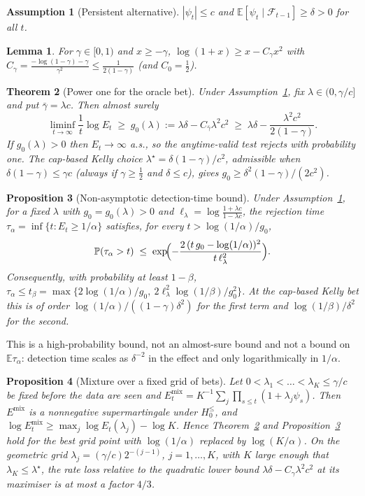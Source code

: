 \documentclass[pdflatex,sn-mathphys-ay]{sn-jnl}%
\theoremstyle{thmstyleone}%
\newtheorem{theorem}{Theorem}%
\newtheorem{proposition}[theorem]{Proposition}%
\newtheorem{lemma}[theorem]{Lemma}%
\theoremstyle{thmstyletwo}%
\theoremstyle{thmstylethree}%
\newtheorem{assumption}{Assumption}%
\newcommand{\E}{\mathbb{E}}
\newcommand{\Prob}{\mathbb{P}}
\newcommand{\F}{\mathcal{F}}
\begin{document}
\begin{assumption}[Persistent alternative]\label{ass:alt}
$|\psi_t|\le c$ and $\E[\psi_t\mid\F_{t-1}]\ge\delta>0$ for all $t$.
\end{assumption}

\begin{lemma}\label{lem:log}
For $\gamma\in[0,1)$ and $x\ge-\gamma$, $\log(1+x)\ge x-C_\gamma x^2$ with
$C_\gamma=\frac{-\log(1-\gamma)-\gamma}{\gamma^2}\le\frac{1}{2(1-\gamma)}$ (and $C_0=\tfrac12$).
\end{lemma}

\begin{theorem}[Power one for the oracle bet]\label{thm:consistency}
Under Assumption~\ref{ass:alt}, fix $\lambda\in(0,\gamma/c]$ and put $\bar\gamma=\lambda c$.
Then almost surely
\[
\liminf_{t\to\infty}\frac1t\log E_t\;\ge\;g_0(\lambda):=\lambda\delta-C_{\bar\gamma}\lambda^2c^2
\;\ge\;\lambda\delta-\frac{\lambda^2c^2}{2(1-\gamma)} .
\]
If $g_0(\lambda)>0$ then $E_t\to\infty$ a.s., so the anytime-valid test rejects with
probability one. The cap-based Kelly choice $\lambda^\star=\delta(1-\gamma)/c^2$, admissible when $\delta(1-\gamma)\le\gamma c$ (always if $\gamma\ge\tfrac12$ and $\delta\le c$), gives
$g_0\ge\delta^2(1-\gamma)/(2c^2)$.
\end{theorem}

\begin{proposition}[Non-asymptotic detection-time bound]\label{prop:latency}
Under Assumption~\ref{ass:alt}, for a fixed $\lambda$ with $g_0=g_0(\lambda)>0$ and
$\ell_\lambda=\log\frac{1+\lambda c}{1-\lambda c}$, the rejection time
$\tau_\alpha=\inf\{t:E_t\ge1/\alpha\}$ satisfies, for every $t>\log(1/\alpha)/g_0$,
\[
\Prob(\tau_\alpha>t)\;\le\;\exp\!\Bigl(-\frac{2\,(t\,g_0-\log(1/\alpha))^2}{t\,\ell_\lambda^2}\Bigr).
\]
Consequently, with probability at least $1-\beta$,
$\tau_\alpha\le t_\beta=\max\bigl\{2\log(1/\alpha)/g_0,\ 2\ell_\lambda^2\log(1/\beta)/g_0^2\bigr\}$.
At the cap-based Kelly bet this is of order $\log(1/\alpha)/((1-\gamma)\delta^2)$ for
the first term and $\log(1/\beta)/\delta^2$ for the second.
\end{proposition}

This is a high-probability bound, not an almost-sure bound and not a bound on
$\E\tau_\alpha$: detection time scales as $\delta^{-2}$ in the effect and only
logarithmically in $1/\alpha$.

\begin{proposition}[Mixture over a fixed grid of bets]\label{prop:mixture}
Let $0<\lambda_1<\dots<\lambda_K\le\gamma/c$ be fixed before the data are seen and
$E^{\mathrm{mix}}_t=K^{-1}\sum_j\prod_{s\le t}(1+\lambda_j\psi_s)$. Then
$E^{\mathrm{mix}}$ is a nonnegative supermartingale under $H_0^{\le}$, and
$\log E^{\mathrm{mix}}_t\ge\max_j\log E_t(\lambda_j)-\log K$. Hence
Theorem~\ref{thm:consistency} and Proposition~\ref{prop:latency} hold for the best grid
point with $\log(1/\alpha)$ replaced by $\log(K/\alpha)$. On the geometric grid
$\lambda_j=(\gamma/c)2^{-(j-1)}$, $j=1,\dots,K$, with $K$ large enough that $\lambda_K\le\lambda^\star$, the rate loss relative to the quadratic lower bound $\lambda\delta-C_\gamma\lambda^2c^2$ at its maximiser is at most a factor $4/3$.
\end{proposition}
\end{document}
